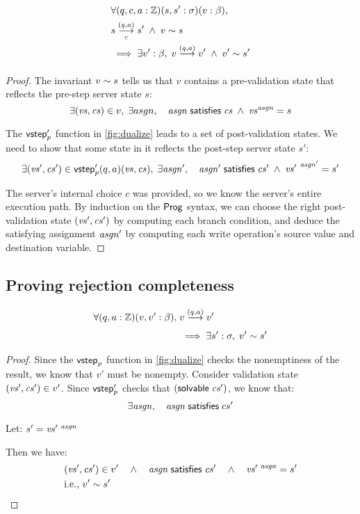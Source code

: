 \begin{lemma}[\ref{eq:rs2}]
  \begin{align*}
    &\forall(q,c,a:\Int)(s,s':\sigma)(v:\beta),\\
    &\triggers sc{(q,a)}s'\;\wedge\;\Reflects{v}{s}\\
    &\implies\exists v':\beta,\;\behaves v{(q,a)}v'\;\wedge\;\Reflects{v'}{s'}
  \end{align*}
\begin{proof}
The invariant $v\sim s$ tells us that $v$ contains a pre-validation
state that reflects the pre-step server state $s$:
\[\exists(\mathit{vs},\mathit{cs})\in v,\;\exists asgn,\quad\mathit{asgn}\;\mathsf{satisfies}\;\mathit{cs}\;\wedge\;{\mathit{vs}}^{\mathit{asgn}}=s\]

The $\mathsf{vstep}'_p$ function in \autoref{fig:dualize} leads to a set of
post-validation states.  We need to show that some state in it reflects the
post-step server state $s'$:
\[\exists(\mathit{vs}',\mathit{cs}')\in\mathsf{vstep}_p'(q,a)(\mathit{vs},\mathit{cs}),\;\exists\mathit{asgn}',\quad\mathit{asgn}'\;\mathsf{satisfies}\;\mathit{cs}'\;\wedge\;{\mathit{vs}'}^{~\mathit{asgn}'}=s'\]

The server's internal choice $c$ was provided, so we know the server's entire
execution path.  By induction on the $\mathsf{Prog}$ syntax, we can choose the right
post-validation state $(\mathit{vs}',\mathit{cs}')$ by computing each branch condition, and
deduce the satisfying assignment $\mathit{asgn}'$ by computing each write operation's
source value and destination variable.
\end{proof}
\end{lemma}

\subsection{Proving rejection completeness}
\label{sec:proof-complete}

\begin{lemma}[\ref{eq:rc1}]
\begin{align*}
\forall(q,a:\Int)(v,v':\beta),\;&\behaves v{(q,a)}v'\\
&\implies\exists s':\sigma,\;\Reflects{v'}{s'}
\end{align*}
\begin{proof}
Since the $\mathsf{vstep}_p$ function in \autoref{fig:dualize} checks the nonemptiness
of the result, we know that $v'$ must be nonempty.  Consider validation state
$(\mathit{vs}',\mathit{cs}')\in v'$.  Since $\mathsf{vstep}'_p$ checks that $(\mathsf{solvable}\; \mathit{cs}')$, we know
that:
\[\exists \mathit{asgn},\quad\mathit{asgn}\;\mathsf{satisfies}\;cs'\]

Let:
\(s'=\mathit{vs}'^{~\mathit{asgn}}\)

Then we have:
\begin{align*}
&(\mathit{vs}',\mathit{cs}')\in v'\quad\wedge\quad\mathit{asgn}\;\mathsf{satisfies}\;\mathit{cs}'\quad\wedge\quad\mathit{vs}'^{~\mathit{asgn}}=s'\\
&\text{i.e.}\text{, }v'\sim s'\tag*{\qedhere}
\end{align*}
\end{proof}
\end{lemma}

